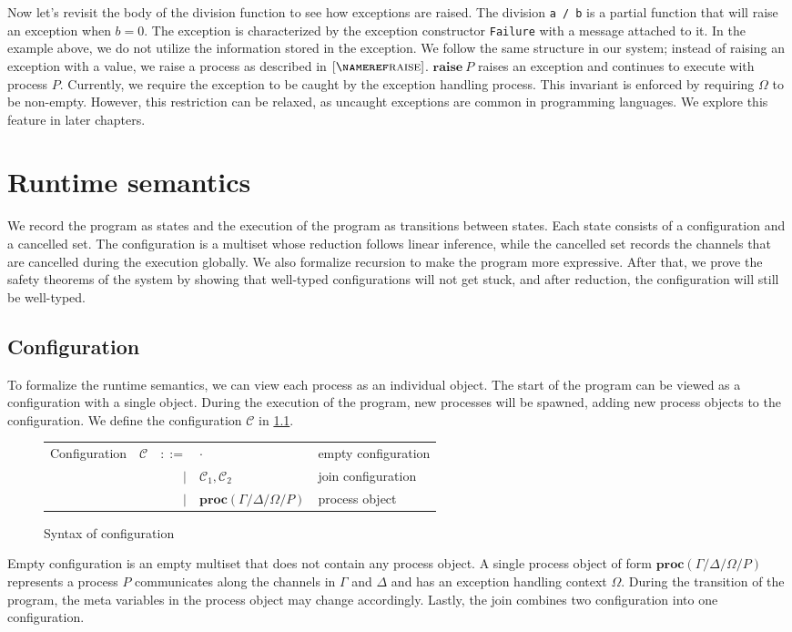 \documentclass[12pt, openany]{memoir}
\newcommand*{\craise}[1]{\textbf{raise}\ #1}
\newcommand*{\procObj}[4]{\textbf{proc}(#1/#2/#3/#4)}
\newcommand*{\config}[0]{\mathcal{C}}
\begin{document}
Now let's revisit the body of the division function to see how exceptions are raised. 
The division \texttt{a / b} is a partial function that will raise an exception when $b = 0$. 
The exception is characterized by the exception constructor \texttt{Failure} with a message attached to it. 
In the example above, we do not utilize the information stored in the exception.
 We follow the same structure in our system; instead of raising an exception with a value, 
 we raise a process as described in $\ruleref{raise}$. $\craise{P}$ raises an exception and continues to execute with process $P$. 
 Currently, we require the exception to be caught by the exception handling process. This invariant is enforced by requiring $\Omega$ to be non-empty. 
 However, this restriction can be relaxed, as uncaught exceptions are common in programming languages. We explore this feature in later chapters.

\chapter{Runtime semantics}
We record the program as states and the execution of the program as transitions between states. 
Each state consists of a configuration and a cancelled set. 
The configuration is a multiset whose reduction follows linear inference, 
while the cancelled set records the channels that are cancelled during the execution globally. 
We also formalize recursion to make the program more expressive. 
After that, we prove the safety theorems of the system by showing that well-typed configurations will not get stuck, 
and after reduction, the configuration will still be well-typed.
\section{Configuration}

To formalize the runtime semantics, we can view each process as an individual object. 
The start of the program can be viewed as a configuration with a single object. 
During the execution of the program, new processes will be spawned, 
adding new process objects to the configuration. We define the configuration $\config$ in \cref{fig:config}.
\begin{figure}[H]
  \centering
  \begin{tabular}{r r r l l}
    Configuration & $\config$ & $::=$ & $\cdot$ & empty configuration \\
    & & $\mid$ & $\config_1, \config_2$ & join configuration \\
    & & $\mid$ & $\procObj{\Gamma}{\Delta}{\Omega}{P}$ & process object
   \end{tabular}
  \caption{Syntax of configuration}
  \label{fig:config}
\end{figure}
Empty configuration is an empty multiset that does not contain any process object.
A single process object of form $\procObj{\Gamma}{\Delta}{\Omega}{P}$ represents a process $P$
communicates along the channels in $\Gamma$ and $\Delta$ and has an exception handling context $\Omega$.
During the transition of the program, the meta variables in the process object may change accordingly.
Lastly, the join combines two configuration into one configuration.
\end{document}
